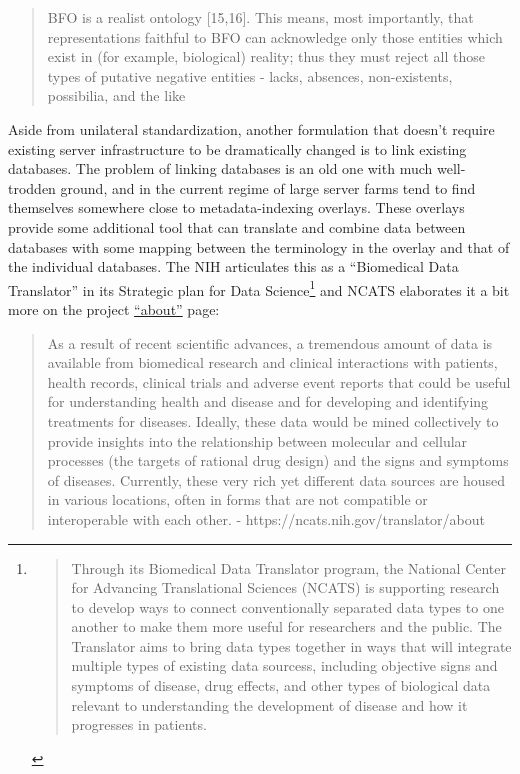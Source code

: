 \documentclass[10pt]{article}
\begin{document}
\begin{multicols}{2}
\begin{quote}
BFO is a realist ontology {[}15,16{]}. This means, most importantly,
that representations faithful to BFO can acknowledge only those entities
which exist in (for example, biological) reality; thus they must reject
all those types of putative negative entities - lacks, absences,
non-existents, possibilia, and the like \cite{ceustersFoundationsRealistOntology2010} 
\end{quote}

Aside from unilateral standardization, another formulation that doesn't
require existing server infrastructure to be dramatically changed is to
link existing databases. The problem of linking databases is an old one
with much well-trodden ground, and in the current regime of large server
farms tend to find themselves somewhere close to metadata-indexing
overlays. These overlays provide some additional tool that can translate
and combine data between databases with some mapping between the
terminology in the overlay and that of the individual databases. The NIH
articulates this as a ``Biomedical Data Translator'' in its Strategic
plan for Data Science\footnote{\begin{quote}
  Through its Biomedical Data Translator program, the National Center
  for Advancing Translational Sciences (NCATS) is supporting research to
  develop ways to connect conventionally separated data types to one
  another to make them more useful for researchers and the public. The
  Translator aims to bring data types together in ways that will
  integrate multiple types of existing data sourcess, including
  objective signs and symptoms of disease, drug effects, and other types
  of biological data relevant to understanding the development of
  disease and how it progresses in patients. \cite{NIHStrategicPlan2018} 
  \end{quote}} and NCATS elaborates it a bit more on the project
\href{https://ncats.nih.gov/translator/about}{``about''} page:

\begin{quote}
As a result of recent scientific advances, a tremendous amount of data
is available from biomedical research and clinical interactions with
patients, health records, clinical trials and adverse event reports that
could be useful for understanding health and disease and for developing
and identifying treatments for diseases. Ideally, these data would be
mined collectively to provide insights into the relationship between
molecular and cellular processes (the targets of rational drug design)
and the signs and symptoms of diseases. Currently, these very rich yet
different data sources are housed in various locations, often in forms
that are not compatible or interoperable with each other. -
https://ncats.nih.gov/translator/about
\end{quote}


\end{multicols}
\end{document}
